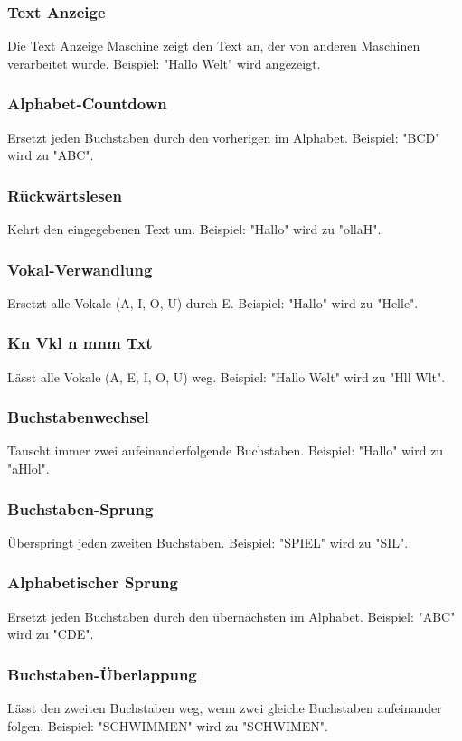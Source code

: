 \documentclass[12pt]{report}
\begin{document}
\subsubsection{Text Anzeige}
Die Text Anzeige Maschine zeigt den Text an, der von anderen Maschinen verarbeitet wurde. Beispiel: "Hallo Welt" wird angezeigt.

\subsubsection{Alphabet-Countdown}
Ersetzt jeden Buchstaben durch den vorherigen im Alphabet. Beispiel: "BCD" wird zu "ABC".

\subsubsection{Rückwärtslesen}
Kehrt den eingegebenen Text um. Beispiel: "Hallo" wird zu "ollaH".

\subsubsection{Vokal-Verwandlung}
Ersetzt alle Vokale (A, I, O, U) durch E. Beispiel: "Hallo" wird zu "Helle".

\subsubsection{Kn Vkl n mnm Txt}
Lässt alle Vokale (A, E, I, O, U) weg. Beispiel: "Hallo Welt" wird zu "Hll Wlt".

\subsubsection{Buchstabenwechsel}
Tauscht immer zwei aufeinanderfolgende Buchstaben. Beispiel: "Hallo" wird zu "aHlol".

\subsubsection{Buchstaben-Sprung}
Überspringt jeden zweiten Buchstaben. Beispiel: "SPIEL" wird zu "SIL".

\subsubsection{Alphabetischer Sprung}
Ersetzt jeden Buchstaben durch den übernächsten im Alphabet. Beispiel: "ABC" wird zu "CDE".

\subsubsection{Buchstaben-Überlappung}
Lässt den zweiten Buchstaben weg, wenn zwei gleiche Buchstaben aufeinander folgen. Beispiel: "SCHWIMMEN" wird zu "SCHWIMEN".
\end{document}

